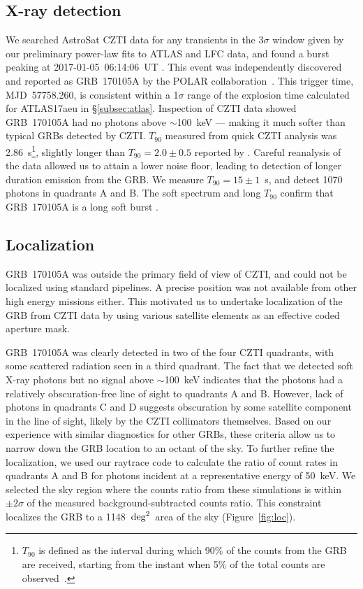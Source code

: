 \documentclass[twocolumn]{aastex6}
\newcommand{\sqd}{\ensuremath{{\rm deg}^2}}
\begin{document}
\subsection{X-ray detection}\label{subsec:xray}
We searched AstroSat CZTI data for any transients in the 3$\sigma$ window given by our preliminary power-law fits to ATLAS and LFC data, and found a burst peaking at 2017-01-05~06:14:06~UT \citep{czti_grb170105A}. This event was independently discovered and reported as GRB~170105A by the POLAR collaboration~\citep{mxh17}. This trigger time, MJD~57758.260, is consistent within a 1$\sigma$ range of the explosion time calculated for ATLAS17aeu in \S\ref{subsec:atlas}.
Inspection of CZTI data showed GRB~170105A had no photons above $\sim$100~keV --- making it much softer than typical GRBs detected by CZTI.
$T_{90}$ measured from quick CZTI analysis was 2.86~s\footnote{$T_{90}$ is defined as the interval during which 90\% of the counts from the GRB are received, starting from the instant when 5\% of the total counts are observed~\citep{kpk+95}.}, slightly longer than $T_{90} = 2.0 \pm 0.5$ reported by \citet{mxh17}. Careful reanalysis of the data allowed us to attain a lower noise floor, leading to detection of longer duration emission from the GRB. We measure $T_{90} = 15\pm1$~s, and detect 1070 photons in quadrants A and B. The soft spectrum and long $T_{90}$ confirm that GRB~170105A is a long soft burst \citep{kmf+93}.


\subsection{Localization}\label{subsec:loc}
GRB~170105A was outside the primary field of view of CZTI, and could not be localized using standard pipelines. A precise position was not available from other high energy missions either. This motivated us to undertake localization of the GRB from CZTI data by using various satellite elements as an effective coded aperture mask.

GRB~170105A was clearly detected in two of the four CZTI quadrants, with some scattered radiation seen in a third quadrant. The fact that we detected soft X-ray photons but no signal above $\sim$100~keV indicates that the photons had a relatively obscuration-free line of sight to quadrants A and B. However, lack of photons in quadrants C and D suggests obscuration by some satellite component in the line of sight, likely by the CZTI collimators themselves. Based on our experience with similar diagnostics for other GRBs, these criteria allow us to narrow down the GRB location to an octant of the sky. To further refine the localization, we used our raytrace code to calculate the ratio of count rates in quadrants A and B for photons incident at a representative energy of 50~keV. We selected the sky region where the counts ratio from these simulations is within $\pm2\sigma$ of the measured background-subtracted counts ratio. This constraint localizes the GRB to a 1148~\sqd\ area of the sky (Figure~\ref{fig:loc}). 
\end{document}
